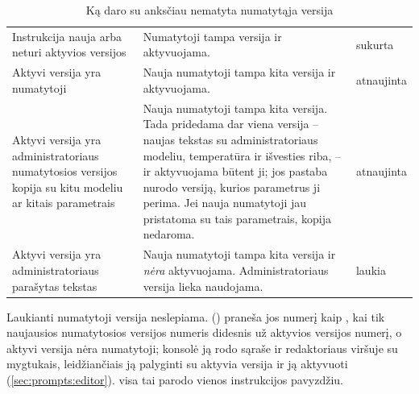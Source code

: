 \begin{table}[H]
\caption{Ką  daro su anksčiau nematyta numatytąja versija}\label{tab:prompts:seed}
\begin{tabularx}{\textwidth}{@{}L{47mm}Yl@{}}
\toprule
{} &  &  \\
\midrule
Instrukcija nauja arba neturi aktyvios versijos & Numatytoji tampa versija ir aktyvuojama. & sukurta \\
Aktyvi versija yra numatytoji & Nauja numatytoji tampa kita versija ir aktyvuojama. & atnaujinta \\
Aktyvi versija yra administratoriaus numatytosios versijos kopija su kitu modeliu ar kitais parametrais & Nauja numatytoji tampa kita versija. Tada pridedama dar viena versija -- naujas tekstas su administratoriaus modeliu, temperatūra ir išvesties riba, -- ir aktyvuojama būtent ji; jos pastaba nurodo versiją, kurios parametrus ji perima. Jei nauja numatytoji jau pristatoma su tais parametrais, kopija nedaroma. & atnaujinta \\
Aktyvi versija yra administratoriaus parašytas tekstas & Nauja numatytoji tampa kita versija ir \emph{nėra} aktyvuojama. Administratoriaus versija lieka naudojama. & laukia \\
\bottomrule
\end{tabularx}
\end{table}

Laukianti numatytoji versija neslepiama.  ()
praneša jos numerį kaip , kai tik naujausios numatytosios versijos numeris
didesnis už aktyvios versijos numerį, o aktyvi versija nėra numatytoji; konsolė ją rodo sąraše
ir redaktoriaus viršuje su mygtukais, leidžiančiais ją palyginti su aktyvia versija ir ją
aktyvuoti (\cref{sec:prompts:editor}).  visa tai parodo vienos instrukcijos
pavyzdžiu.

